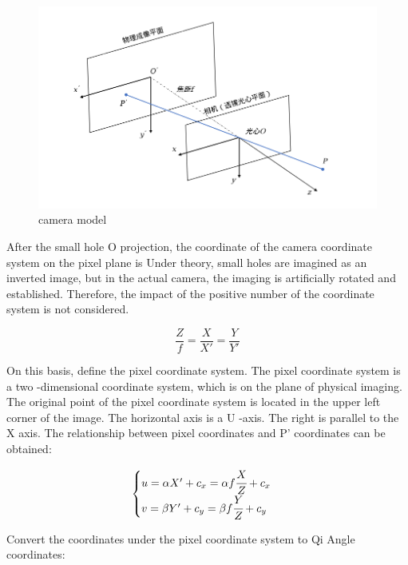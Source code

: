 \documentclass[conference]{IEEEtran}
\begin{document}
\begin{figure}[htbp]
    \centerline{\includegraphics[width=0.9\columnwidth]{camera.png}}
    \caption{camera model}
\end{figure}

After the small hole O projection, the coordinate of the camera coordinate system on the pixel plane is
Under theory, small holes are imagined as an inverted image, but in the actual camera, 
the imaging is artificially rotated and established. 
Therefore, the impact of the positive number of the coordinate system is not considered.

\begin{equation}
    \frac{Z}{f}=\frac{X}{X'}=\frac{Y}{Y'}
\end{equation}

On this basis, define the pixel coordinate system. 
The pixel coordinate system is a two -dimensional coordinate system, 
which is on the plane of physical imaging. 
The original point of the pixel coordinate system is located in the upper left corner of the image. 
The horizontal axis is a U -axis. The right is parallel to the X axis. 
The relationship between pixel coordinates and P' coordinates can be obtained:

\begin{equation}
    \begin{cases}
    u=\alpha X'+c_x=\alpha f \cfrac{X}{Z}+c_x \\
    v=\beta Y' +c_y=\beta f  \cfrac{Y}{Z}+c_y \\
    \end{cases}
\end{equation}

Convert the coordinates under the pixel coordinate system to Qi Angle coordinates: 
\end{document}
